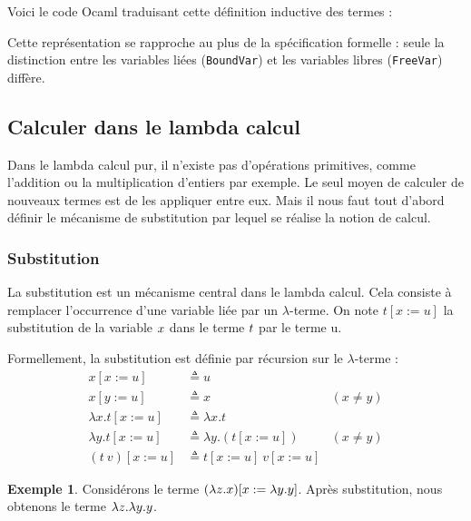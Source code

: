 \documentclass {article}
\newcommand{\codefrom}[3]
           {}
\theoremstyle{definition}
\newtheorem{example}{Exemple}
\theoremstyle{remark}
\begin{document}
Voici le code Ocaml traduisant cette définition inductive des termes :
%
\codefrom{untyped}{lambda}{untyped_term}

Cette représentation se rapproche au plus de la spécification formelle
: seule la distinction entre les variables liées (\lstinline!BoundVar!)
et les variables libres (\lstinline!FreeVar!) diffère.



  
\subsection{Calculer dans le lambda calcul}
\label{calculer_dans_le_lambda_calcul}

Dans le lambda calcul pur, il n'existe pas d'opérations primitives, comme l'addition ou la multiplication d'entiers par exemple. Le seul moyen de calculer de nouveaux termes est de les appliquer 
entre eux. Mais il nous faut tout d'abord définir le mécanisme de substitution par lequel se réalise la notion de calcul.

\subsubsection{Substitution}

\newcommand{\subst}[3]{#1[#2 := #3]}


La substitution est un mécanisme central dans le lambda calcul. Cela consiste 
à remplacer l'occurrence d'une variable liée par un \(\lambda\)-terme.
On note \(\subst{t}{x}{u}\) la substitution de la variable $x$ dans le terme $t$ par le 
terme u.

Formellement, la substitution est définie par récursion sur le $\lambda$-terme : 
\begin{align*}
    \subst{x}{x}{u} &\triangleq u \\
    \subst{x}{y}{u} &\triangleq x & (x \neq y)\\
    \subst{\lambda x.t}{x}{u} &\triangleq \lambda x.t \\
    \subst{\lambda y.t}{x}{u} &\triangleq \lambda y. (\subst{t}{x}{u}) & (x \neq y)\\
    \subst{(t\: v)}{x}{u} &\triangleq \subst{t}{x}{u}\: \subst{v}{x}{u}
\end{align*}

\begin{example}
  Considérons le terme $\subst{(\Lam{z}{x})}{x}{\Lam{y}{y}}$. Après substitution, nous obtenons le terme $\lambda z. \lambda y. y$.
\end{example}
\end{document}
